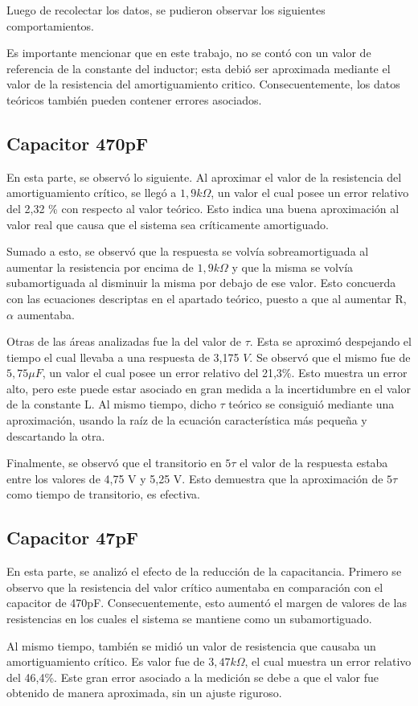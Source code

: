 \documentclass{article}
\begin{document}
    	Luego de recolectar los datos, se pudieron observar los siguientes comportamientos. \par
	Es importante mencionar que en este trabajo, no se contó con un valor de referencia de la constante del inductor; esta debió ser aproximada mediante el valor de la resistencia del amortiguamiento critico. Consecuentemente, los datos teóricos también pueden contener errores asociados.
	
        \subsection*{Capacitor 470pF}
        	En esta parte, se observó lo siguiente. Al aproximar el valor de la resistencia del amortiguamiento crítico, se llegó a $1,9k\Omega$, un valor el cual posee un error relativo del 2,32 \% con respecto al valor teórico. Esto indica una buena aproximación al valor real que causa que el sistema sea críticamente amortiguado. \par
	Sumado a esto, se observó que la respuesta se volvía sobreamortiguada al aumentar la resistencia por encima de $1,9k\Omega$ y que la misma se volvía subamortiguada al disminuir la misma por debajo de ese valor. Esto concuerda con las ecuaciones descriptas en el apartado teórico, puesto a que al aumentar R, $\alpha$ aumentaba. \par
	Otras de las áreas analizadas fue la del valor de $\tau$. Esta se aproximó despejando el tiempo el cual llevaba a una respuesta de 3,175 $V$. Se observó que el mismo fue de $5,75\mu F$, un valor el cual posee un error relativo del 21,3\%. Esto muestra un error alto, pero este puede estar asociado en gran medida a la incertidumbre en el valor de la constante L. Al mismo tiempo, dicho $\tau$ teórico se consiguió mediante una aproximación, usando la raíz de la ecuación característica más pequeña y descartando la otra.\par
	Finalmente, se observó que el transitorio en $5\tau$ el valor de la respuesta estaba entre los valores de 4,75 V y 5,25 V. Esto demuestra que la aproximación de $5\tau$ como tiempo de transitorio, es efectiva.
	
	
        \subsection*{Capacitor 47pF}
        En esta parte, se analizó el efecto de la reducción de la capacitancia. Primero se observo que la resistencia del valor crítico aumentaba en comparación con el capacitor de 470pF. Consecuentemente, esto aumentó el margen de valores de las resistencias en los cuales el sistema se mantiene como un subamortiguado.\par
        Al mismo tiempo, también se midió un valor de resistencia que causaba un amortiguamiento crítico. Es valor fue de $3,47k\Omega$, el cual muestra un error relativo del 46,4\%. Este gran error asociado a la medición se debe a que el valor fue obtenido de manera aproximada, sin un ajuste riguroso.\par 
        
\end{document}
